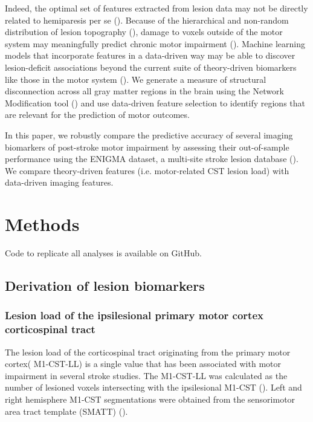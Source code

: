 \documentclass[10pt]{article}
\begin{document}
Indeed, the optimal set of features extracted from lesion data may not be directly related to hemiparesis per se (\cite{Bzdok2020-py, Sperber2021-lw}). Because of the hierarchical and non-random distribution of lesion topography (\cite{Mah2014-cb,Wang2019-dz}), damage to voxels outside of the motor system may meaningfully predict chronic motor impairment (\cite{Sperber2021-lw}). Machine learning models that incorporate features in a data-driven way may be able to discover lesion-deficit associations beyond the current suite of theory-driven biomarkers like those in the motor system (\cite{Kasties2021-rm, Calesella2021-kp}). We generate a measure of structural disconnection across all gray matter regions in the brain using the Network Modification tool (\cite{Kuceyeski2013-nk}) and use data-driven feature selection to identify regions that are relevant for the prediction of motor outcomes. 

In this paper, we robustly compare the predictive accuracy of several imaging biomarkers of post-stroke motor impairment by assessing their out-of-sample performance using the ENIGMA dataset, a multi-site stroke lesion database (\cite{Liew2020-ps}). We compare theory-driven features (i.e. motor-related CST lesion load) with data-driven imaging features. 



\section{Methods}
Code to replicate all analyses is available on GitHub. 

\subsection{Derivation of lesion biomarkers}
\subsubsection{Lesion load of the ipsilesional primary motor cortex corticospinal tract}
The lesion load of the corticospinal tract originating from the primary motor cortex( M1-CST-LL) is a single value that has been associated with motor impairment in several stroke studies. The M1-CST-LL was calculated as the number of lesioned voxels intersecting with the ipsilesional M1-CST (\cite{Zhu2010-qh}). Left and right hemisphere M1-CST segmentations were obtained from the sensorimotor area tract template (SMATT) (\cite{Archer2018-ti}). 
\end{document}
